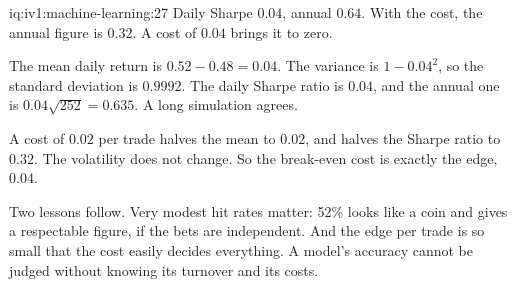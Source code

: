 \begin{solution}{iq:iv1:machine-learning:27}
Daily Sharpe $0.04$, annual $0.64$. With the cost, the annual figure is $0.32$. A cost of $0.04$ brings it to zero.

The mean daily return is $0.52 - 0.48 = 0.04$. The variance is $1 - 0.04^2$, so the standard deviation is $0.9992$. The daily Sharpe ratio is $0.04$, and the annual one is $0.04\sqrt{252} = 0.635$. A long simulation agrees.

A cost of $0.02$ per trade halves the mean to $0.02$, and halves the Sharpe ratio to $0.32$. The volatility does not change. So the break-even cost is exactly the edge, $0.04$.

Two lessons follow. Very modest hit rates matter: 52\% looks like a coin and gives a respectable figure, if the bets are independent. And the edge per trade is so small that the cost easily decides everything. A model's accuracy cannot be judged without knowing its turnover and its costs.



\end{solution}

